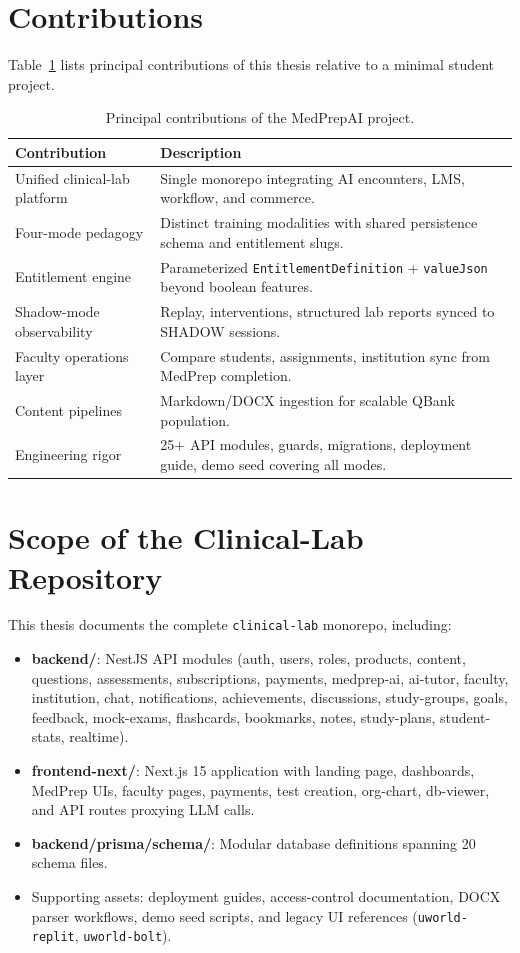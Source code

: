 \section{Contributions}
Table~\ref{tab:contributions} lists principal contributions of this thesis relative to a minimal student project.

\begin{table}[htbp]
  \centering
  \caption{Principal contributions of the MedPrepAI project.}
  \label{tab:contributions}
  \begin{tabular}{@{}p{3.8cm}p{9.2cm}@{}}
    \toprule
    \textbf{Contribution} & \textbf{Description} \\
    \midrule
    Unified clinical-lab platform & Single monorepo integrating AI encounters, LMS, workflow, and commerce. \\
    Four-mode pedagogy & Distinct training modalities with shared persistence schema and entitlement slugs. \\
    Entitlement engine & Parameterized \texttt{EntitlementDefinition} + \texttt{valueJson} beyond boolean features. \\
    Shadow-mode observability & Replay, interventions, structured lab reports synced to SHADOW sessions. \\
    Faculty operations layer & Compare students, assignments, institution sync from MedPrep completion. \\
    Content pipelines & Markdown/DOCX ingestion for scalable QBank population. \\
    Engineering rigor & 25+ API modules, guards, migrations, deployment guide, demo seed covering all modes. \\
    \bottomrule
  \end{tabular}
\end{table}

\section{Scope of the Clinical-Lab Repository}
This thesis documents the complete \texttt{clinical-lab} monorepo, including:
\begin{itemize}
  \item \textbf{backend/}: NestJS API modules (auth, users, roles, products, content, questions, assessments, subscriptions, payments, medprep-ai, ai-tutor, faculty, institution, chat, notifications, achievements, discussions, study-groups, goals, feedback, mock-exams, flashcards, bookmarks, notes, study-plans, student-stats, realtime).
  \item \textbf{frontend-next/}: Next.js 15 application with landing page, dashboards, MedPrep UIs, faculty pages, payments, test creation, org-chart, db-viewer, and API routes proxying LLM calls.
  \item \textbf{backend/prisma/schema/}: Modular database definitions spanning 20 schema files.
  \item Supporting assets: deployment guides, access-control documentation, DOCX parser workflows, demo seed scripts, and legacy UI references (\texttt{uworld-replit}, \texttt{uworld-bolt}).
\end{itemize}

